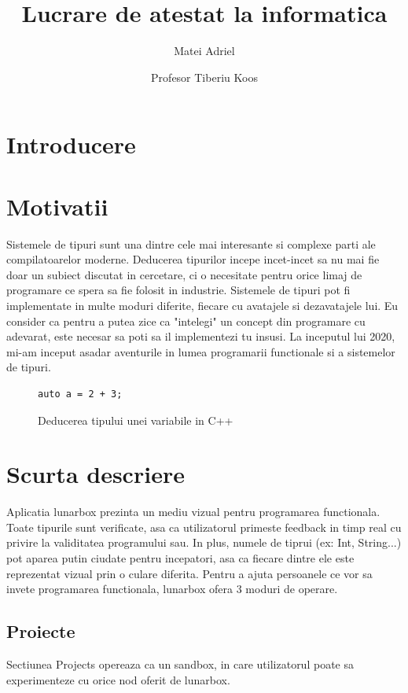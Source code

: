\documentclass{article}
\title{Lucrare de atestat la informatica}
\author{Matei Adriel \and Profesor Tiberiu Koos}
\begin{document}
\maketitle


\newpage
\tableofcontents


\newpage
\section{Introducere}
\section{Motivatii}
Sistemele de tipuri sunt una dintre cele mai interesante si complexe parti ale compilatoarelor moderne.
Deducerea tipurilor incepe incet-incet sa nu mai fie doar un subiect discutat in cercetare, ci o necesitate pentru orice limaj de programare ce spera sa fie folosit in industrie.
Sistemele de tipuri pot fi implementate in multe moduri diferite, fiecare cu avatajele si dezavatajele lui.
Eu consider ca pentru a putea zice ca "intelegi" un concept din programare cu adevarat, este necesar sa poti sa il implementezi tu insusi.
La inceputul lui 2020, mi-am inceput asadar aventurile in lumea programarii functionale si a sistemelor de tipuri.

\begin{figure}[h]
	\centering
	\begin{minipage}{100px}
		\begin{verbatim}
auto a = 2 + 3;
\end{verbatim}
	\end{minipage}
	\caption{Deducerea tipului unei variabile in C++}
\end{figure}


\section{Scurta descriere}
Aplicatia lunarbox prezinta un mediu vizual pentru programarea functionala.
Toate tipurile sunt verificate, asa ca utilizatorul primeste feedback in timp real cu privire la validitatea programului sau.
In plus, numele de tiprui (ex: Int, String...) pot aparea putin ciudate pentru incepatori, asa ca fiecare dintre ele este reprezentat vizual prin o culare diferita.
Pentru a ajuta persoanele ce vor sa invete programarea functionala, lunarbox ofera 3 moduri de operare.

\newpage
\subsection{Proiecte}
Sectiunea Projects opereaza ca un sandbox, in care utilizatorul poate sa experimenteze cu orice nod oferit de lunarbox.
\end{document}
